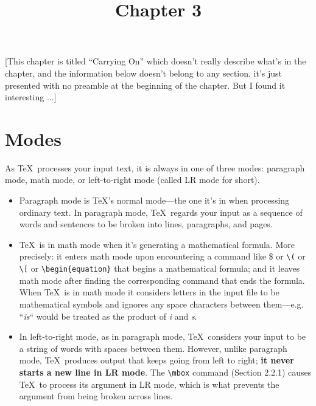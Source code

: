 \documentclass{article}
\title{Chapter 3} %
\author{}
\date{}
\begin{document}

\maketitle %

[This chapter is titled ``Carrying On'' which doesn't really describe what's in the chapter, and the
information below doesn't belong to any section, it's just presented with no preamble at the
beginning of the chapter. But I found it interesting ...] 

\section{Modes}

As \TeX\ processes your input text, it is always in one of three modes: paragraph mode, math mode,
or left-to-right mode (called LR mode for short). 

\begin{itemize}
   
   \item Paragraph mode is \TeX's normal mode---the one it's in when processing ordinary text. In
    paragraph mode, \TeX\ regards your input as a sequence of words and sentences to be broken into
    lines, paragraphs, and pages.

    \item \TeX\ is in math mode when it's generating a mathematical formula. More precisely: it
     enters math mode upon encountering a command like 
     \$ or 
     \verb:\(: or
     \verb:\[: or
     \verb:\begin{equation}: 
     that begins a mathematical formula; and it leaves math mode after finding the corresponding
     command that ends the formula. When \TeX\ is in math mode it considers letters in the input
     file to be mathematical symbols and ignores any space characters 
     between them—e.g. ``\emph{is}`` would be treated as the product of \emph{i} and \emph{s}.
     
    \item In left-to-right mode, as in paragraph mode, \TeX\ considers your input to be a string of
     words with spaces between them. However, unlike paragraph mode, \TeX\ produces output that
     keeps going from left to right; \textbf{it never starts a new line in LR mode}.
     The \verb:\mbox: command (Section 2.2.1) causes \TeX\ to process its argument in LR mode,
     which is what prevents the argument from being broken across lines.

\end{itemize}
\end{document}
